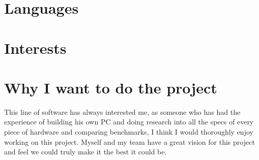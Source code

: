 \documentclass[11pt,a4paper,sans]{moderncv} %
\begin{document}

\section{Languages}



\section{Interests}
\renewcommand{\listitemsymbol}{-~} %

\section{Why I want to do the project}
This line of software has always interested me, as someone who has had the experience of building his own PC and doing research into all the specs of every piece of hardware and comparing benchmarks, I think I would thoroughly enjoy working on this project. Myself and my team have a great vision for this project and feel we could truly make it the best it could be.

\end{document}

